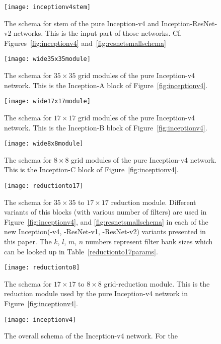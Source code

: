 \documentclass[10pt,twocolumn,letterpaper]{article}
\begin{document}
\begin{figure}
\centering
\texttt{[image: inceptionv4stem]}
\caption{The schema for stem of the pure Inception-v4 and
  Inception-ResNet-v2 networks. This is the input part of those
networks. Cf. Figures~\ref{fig:inceptionv4} and~\ref{fig:resnetsmallschema} }
\label{fig:inceptionv4stem}
\end{figure}\begin{figure}
\centering
\texttt{[image: wide35x35module]}
\caption{The schema for $35\times 35$ grid modules of the pure Inception-v4
 network. This is the Inception-A block of Figure~\ref{fig:inceptionv4}. }
\label{fig:wide35x35module}
\end{figure}\begin{figure}
\centering
\texttt{[image: wide17x17module]}
\caption{The schema for $17\times 17$ grid modules of the pure Inception-v4
 network. This is the Inception-B block of Figure~\ref{fig:inceptionv4}.}
\label{fig:wide17x17module}
\end{figure}\begin{figure}
\centering
\texttt{[image: wide8x8module]}
\caption{The schema for $8\times 8$ grid modules of the pure Inception-v4
 network. This is the Inception-C block of Figure~\ref{fig:inceptionv4}.}
\label{fig:wide8x8module}
\end{figure}\begin{figure}
\centering
\texttt{[image: reductionto17]}
\caption{The schema for $35\times 35$ to $17\times 17$ reduction module.
  Different variants of this blocks (with various number of filters) are
  used in Figure~\ref{fig:inceptionv4}, and \ref{fig:resnetsmallschema}
  in each of the new Inception(-v4, -ResNet-v1, -ResNet-v2) variants
  presented in this paper. The $k$, $l$, $m$, $n$ numbers represent
  filter bank sizes which can be looked up in Table~\ref{reductionto17params}.
}
\label{fig:reductionto17}
\end{figure}\begin{figure}
\centering
\texttt{[image: reductionto8]}
\caption{The schema for $17\times 17$ to $8\times 8$ grid-reduction module.
  This is the reduction module used by the pure Inception-v4 network in
  Figure~\ref{fig:inceptionv4}.
}
\label{fig:reductionto8}
\end{figure}\begin{figure}
\centering
\texttt{[image: inceptionv4]}
\caption{The overall schema of the Inception-v4 network. For the
}
\end{figure}
\end{document}
